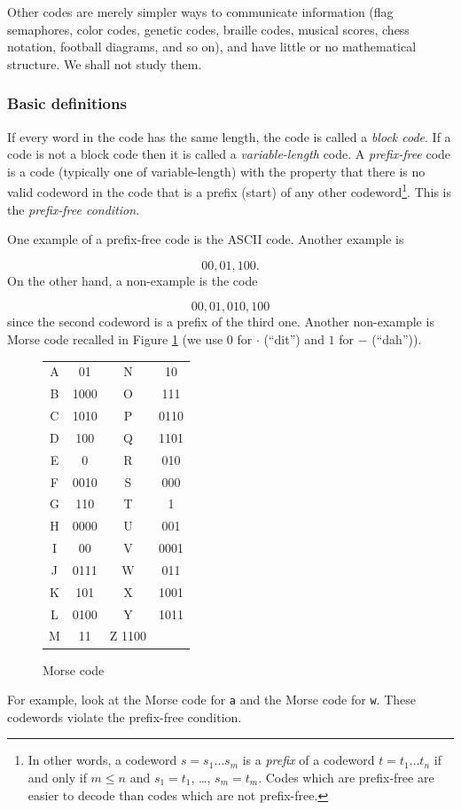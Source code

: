 Other codes are merely simpler ways to communicate information
(flag semaphores, color codes, genetic codes, braille codes, musical scores, chess
notation, football diagrams, and so on), and have little or no
mathematical structure. We shall not study them.



\subsubsection{Basic definitions}

If every word in the code has the same length, the code is called
a {\it block code}. If a code is not a block code then it is called
a {\it variable-length} code.
A {\it prefix-free} code is a code (typically one of variable-length)
with the property that there is no valid codeword in the code that
is a prefix (start) of any other codeword\footnote{In other words,
a codeword $s=s_1 \dots s_m$ is a {\it prefix} of a codeword
$t=t_1\dots t_n$ if and only if $m\leq n$ and
$s_1=t_1$, \dots, $s_m=t_m$. Codes which are prefix-free are easier
to decode than codes which are not prefix-free.}.
This is the {\it prefix-free condition}.

One example of a prefix-free code is the ASCII code.
Another example is

\[
00, 01, 100.
\]
On the other hand, a non-example is the code

\[
00, 01, 010, 100
\]
since the second codeword is a prefix of the third one.
Another non-example is Morse code recalled in
Figure \ref{fig:Morse} (we use $0$ for
$\cdot$ (``dit'') and $1$ for $-$ (``dah'')).

\begin{figure}[h!]
\begin{center}
\begin{tabular}{c|c|| c | c}
A & 01     & N & 10 \\
B & 1000 &O & 111\\
C & 1010 & P & 0110\\
D & 100  & Q & 1101\\
E & 0       & R & 010\\
F & 0010  & S & 000\\
G & 110   & T & 1\\
H & 0000   & U & 001\\
I & 00        & V & 0001\\
J & 0111   & W & 011\\
K & 101    & X & 1001\\
L & 0100   & Y & 1011\\
M & 11      & Z 1100\\
\end{tabular}
\end{center}
\caption{Morse code}
\label{fig:Morse}
\end{figure}
For example, look at the Morse code for {\tt a} and the Morse code for
{\tt w}. These codewords violate the prefix-free condition.

